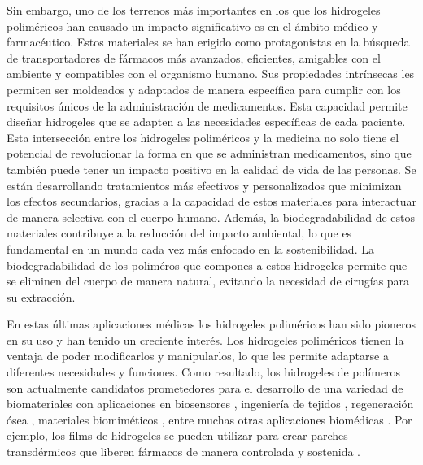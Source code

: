 Sin embargo, uno de los terrenos m\'as importantes en los que los hidrogeles polim\'ericos han causado un impacto significativo es en el \'ambito m\'edico y farmac\'eutico. Estos materiales se han erigido como protagonistas en la b\'usqueda de transportadores de f\'armacos m\'as avanzados, eficientes, amigables con el ambiente y compatibles con el organismo humano. Sus propiedades intr\'insecas les permiten ser moldeados y adaptados de manera espec\'ifica para cumplir con los requisitos \'unicos de la administraci\'on de medicamentos.
Esta capacidad permite dise\~nar hidrogeles  que se adapten a las necesidades espec\'ificas de cada paciente.
Esta intersecci\'on entre los hidrogeles polim\'ericos y la medicina no solo tiene el potencial de revolucionar la forma en que se administran medicamentos, sino que tambi\'en puede tener un impacto positivo en la calidad de vida de las personas. Se est\'an desarrollando tratamientos m\'as efectivos y personalizados que minimizan los efectos secundarios, gracias a la capacidad de estos materiales para interactuar de manera selectiva con el cuerpo humano. Adem\'as, la biodegradabilidad de estos materiales contribuye a la reducci\'on del impacto ambiental, lo que es fundamental en un mundo cada vez m\'as enfocado en la sostenibilidad.
La biodegradabilidad de los polim\'eros que compones a estos hidrogeles permite que se eliminen del cuerpo de manera natural, evitando la necesidad de cirug\'ias para su extracci\'on. \cite{samir2022recent}

En estas \'ultimas aplicaciones m\'edicas los hidrogeles polim\'ericos han sido pioneros en su uso y han tenido un creciente inter\'es.
Los hidrogeles polim\'ericos tienen la ventaja de poder modificarlos y manipularlos, lo que les permite adaptarse a diferentes necesidades y funciones.
Como resultado, los hidrogeles de pol\'imeros son actualmente candidatos prometedores para el desarrollo de una variedad de biomateriales con aplicaciones en biosensores \cite{zhang2012ultrathin,islam2014responsive}, ingenier\'ia de tejidos \cite{matricardi2013interpenetrating,van2011biopolymer}, regeneraci\'on \'osea \cite{bai2018bioactive}, materiales biomim\'eticos \cite{green2016mimicking,wu2010multifunctional}, entre muchas otras aplicaciones biom\'edicas \cite{Daly2020}.
Por ejemplo, los films de  hidrogeles se pueden utilizar para crear parches transd\'ermicos que liberen f\'armacos de manera controlada y sostenida  \cite{indulekha2016thermoresponsive}.

